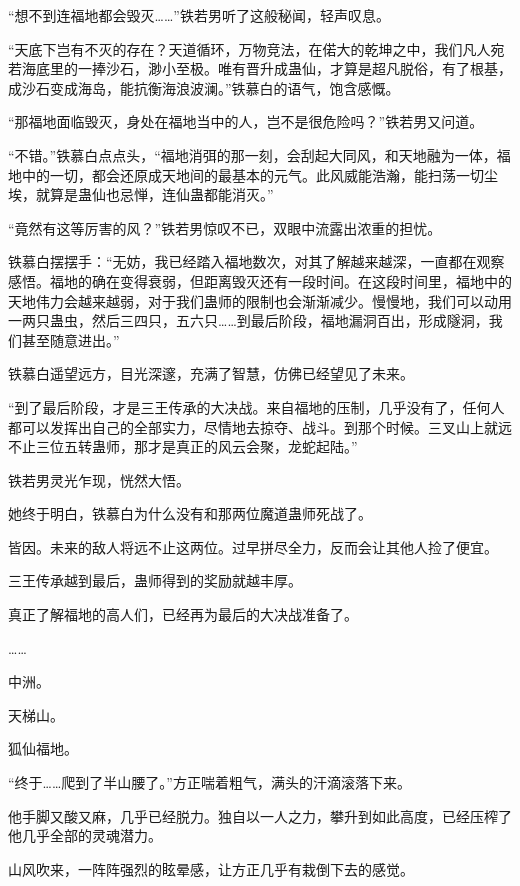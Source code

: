 
\begin{this_body}

“想不到连福地都会毁灭……”铁若男听了这般秘闻，轻声叹息。

“天底下岂有不灭的存在？天道循环，万物竞法，在偌大的乾坤之中，我们凡人宛若海底里的一捧沙石，渺小至极。唯有晋升成蛊仙，才算是超凡脱俗，有了根基，成沙石变成海岛，能抗衡海浪波澜。”铁慕白的语气，饱含感慨。

“那福地面临毁灭，身处在福地当中的人，岂不是很危险吗？”铁若男又问道。

“不错。”铁慕白点点头，“福地消弭的那一刻，会刮起大同风，和天地融为一体，福地中的一切，都会还原成天地间的最基本的元气。此风威能浩瀚，能扫荡一切尘埃，就算是蛊仙也忌惮，连仙蛊都能消灭。”

“竟然有这等厉害的风？”铁若男惊叹不已，双眼中流露出浓重的担忧。

铁慕白摆摆手：“无妨，我已经踏入福地数次，对其了解越来越深，一直都在观察感悟。福地的确在变得衰弱，但距离毁灭还有一段时间。在这段时间里，福地中的天地伟力会越来越弱，对于我们蛊师的限制也会渐渐减少。慢慢地，我们可以动用一两只蛊虫，然后三四只，五六只……到最后阶段，福地漏洞百出，形成隧洞，我们甚至随意进出。”

铁慕白遥望远方，目光深邃，充满了智慧，仿佛已经望见了未来。

“到了最后阶段，才是三王传承的大决战。来自福地的压制，几乎没有了，任何人都可以发挥出自己的全部实力，尽情地去掠夺、战斗。到那个时候。三叉山上就远不止三位五转蛊师，那才是真正的风云会聚，龙蛇起陆。”

铁若男灵光乍现，恍然大悟。

她终于明白，铁慕白为什么没有和那两位魔道蛊师死战了。

皆因。未来的敌人将远不止这两位。过早拼尽全力，反而会让其他人捡了便宜。

三王传承越到最后，蛊师得到的奖励就越丰厚。

真正了解福地的高人们，已经再为最后的大决战准备了。

……

中洲。

天梯山。

狐仙福地。

“终于……爬到了半山腰了。”方正喘着粗气，满头的汗滴滚落下来。

他手脚又酸又麻，几乎已经脱力。独自以一人之力，攀升到如此高度，已经压榨了他几乎全部的灵魂潜力。

山风吹来，一阵阵强烈的眩晕感，让方正几乎有栽倒下去的感觉。


\end{this_body}
